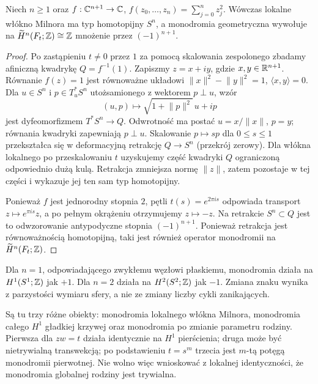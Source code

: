 \begin{twierdzenie}
\label{thm:a1-monodromy-xiv}
Niech $n\ge1$ oraz
$f:\mathbb{C}^{n+1}\to\mathbb{C}$,
$f(z_0,\dots,z_n)=\sum_{j=0}^nz_j^2$.
Wówczas lokalne włókno Milnora ma typ homotopijny $S^n$,
a monodromia geometryczna wywołuje na
$\widetilde H^n(F_t;\mathbb{Z})\cong\mathbb{Z}$ mnożenie przez
$(-1)^{n+1}$.
\end{twierdzenie}
\begin{proof}
Po zastąpieniu $t\ne0$ przez $1$ za pomocą
skalowania zespolonego zbadamy afiniczną
kwadrykę $Q=f^{-1}(1)$. Zapiszmy $z=x+iy$,
gdzie $x,y\in\mathbb{R}^{n+1}$. Równanie $f(z)=1$
jest równoważne układowi
$\lVert x\rVert^2-\lVert y\rVert^2=1$,
$\langle x,y\rangle=0$.
Dla $u\in S^n$ i $p\in T_u^*S^n$ utożsamionego
z wektorem $p\perp u$, wzór
\[
(u,p)\longmapsto\sqrt{1+\lVert p\rVert^2}\,u+ip
\]
jest dyfeomorfizmem $T^*S^n\to Q$.
Odwrotność ma postać
$u=x/\lVert x\rVert$, $p=y$;
równania kwadryki zapewniają $p\perp u$.
Skalowanie $p\mapsto sp$ dla $0\le s\le1$
przekształca się w deformacyjną retrakcję
$Q\to S^n$ (przekrój zerowy).
Dla włókna lokalnego po przeskalowaniu $t$
uzyskujemy część kwadryki $Q$ ograniczoną
odpowiednio dużą kulą. Retrakcja zmniejsza
normę $\lVert z\rVert$, zatem pozostaje w tej
części i wykazuje jej ten sam typ homotopijny.

Ponieważ $f$ jest jednorodny stopnia $2$,
pętli $t(s)=e^{2\pi is}$ odpowiada transport
$z\mapsto e^{\pi is}z$, a po pełnym okrążeniu
otrzymujemy $z\mapsto-z$. Na retrakcie
$S^n\subset Q$ jest to odwzorowanie
antypodyczne stopnia $(-1)^{n+1}$.
Ponieważ retrakcja jest równoważnością
homotopijną, taki jest również operator
monodromii na $\widetilde H^n(F_t;\mathbb{Z})$.
\end{proof}
\begin{przyklad}
Dla $n=1$, odpowiadającego zwykłemu węzłowi
płaskiemu, monodromia działa na $H^1(S^1;\mathbb{Z})$
jak $+1$. Dla $n=2$ działa na
$H^2(S^2;\mathbb{Z})$ jak $-1$. Zmiana znaku wynika z
parzystości wymiaru sfery, a nie ze zmiany
liczby cykli zanikających.
\end{przyklad}

\begin{uwaga}
Są tu trzy różne obiekty: monodromia lokalnego włókna Milnora,
monodromia całego $H^1$ gładkiej krzywej oraz monodromia
po zmianie parametru rodziny. Pierwsza dla $zw=t$ działa
identycznie na $H^1$ pierścienia; druga może być
nietrywialną transwekcją; po podstawieniu $t=s^m$
trzecia jest $m$-tą potęgą monodromii pierwotnej.
Nie wolno więc wnioskować z lokalnej identyczności, że
monodromia globalnej rodziny jest trywialna.
\end{uwaga}

